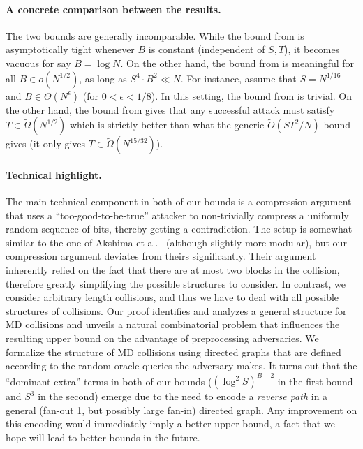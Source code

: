 \paragraph{A concrete comparison between the results.}
The two bounds are generally incomparable. While the bound from  is asymptotically tight whenever $B$ is constant (independent of $S,T$), it becomes vacuous for say $B= \log N$. On the other hand, the bound from  is meaningful for all $B\in o(N^{1/2})$, as long as $S^4\cdot B^2 \ll N$.  For instance, assume that $S = N^{1/16}$ and $B \in \Theta(N^\epsilon)$ (for $0<\epsilon<1/8$). In this setting, the  bound from  is trivial. On the other hand, the bound from  gives that any successful attack must satisfy $T \in \tilde \Omega(N^{1/2})$ which is strictly better than what the generic $\tilde O(ST^2/N)$ bound gives (it only gives $T \in\tilde \Omega(N^{15/32})$).


\paragraph{Technical highlight.} The main technical component in both of our bounds is a compression argument that uses a ``too-good-to-be-true'' attacker to non-trivially compress a uniformly random sequence of bits, thereby getting a contradiction. The setup is somewhat similar to the one of Akshima et al.~\cite{AkshimaCDW20} (although slightly more modular), but our compression argument deviates from theirs significantly. Their argument inherently relied on the fact that there are at most two blocks in the collision, therefore greatly simplifying the possible structures to consider. In contrast, we consider arbitrary length collisions, and thus we have to deal with all possible structures of collisions. Our proof identifies and analyzes a general structure for MD collisions and unveils a natural combinatorial problem that influences the resulting upper bound on the advantage of preprocessing adversaries. We formalize the structure of MD collisions using directed graphs that are defined according to the random oracle queries the adversary makes.
It turns out that the ``dominant extra'' terms in both of our bounds ($(\log^2 S)^{B-2}$ in the first bound and $S^3$ in the second) emerge due to the need to encode a \emph{reverse path} in a general (fan-out 1, but possibly large fan-in) directed graph. Any improvement on this encoding would immediately imply a better upper bound, a fact that we hope will lead to better bounds in the future.


